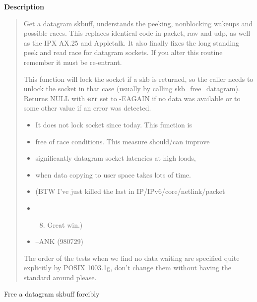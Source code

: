 \documentclass[a4paper,8pt,english]{sphinxmanual}
\begin{document}
\textbf{Description}
\begin{quote}

Get a datagram skbuff, understands the peeking, nonblocking wakeups
and possible races. This replaces identical code in packet, raw and
udp, as well as the IPX AX.25 and Appletalk. It also finally fixes
the long standing peek and read race for datagram sockets. If you
alter this routine remember it must be re-entrant.

This function will lock the socket if a skb is returned, so
the caller needs to unlock the socket in that case (usually by
calling skb\_free\_datagram). Returns NULL with \textbf{err} set to
-EAGAIN if no data was available or to some other value if an
error was detected.
\begin{itemize}
\item {} 
It does not lock socket since today. This function is

\item {} 
free of race conditions. This measure should/can improve

\item {} 
significantly datagram socket latencies at high loads,

\item {} 
when data copying to user space takes lots of time.

\item {} 
(BTW I've just killed the last  in IP/IPv6/core/netlink/packet

\item {} \begin{enumerate}
\setcounter{enumi}{7}
\item {} 
Great win.)

\end{enumerate}

\item {} 
--ANK (980729)

\end{itemize}

The order of the tests when we find no data waiting are specified
quite explicitly by POSIX 1003.1g, don't change them without having
the standard around please.
\end{quote}

\begin{fulllineitems}
\label{networking/kapi:c.skb_kill_datagram}
Free a datagram skbuff forcibly

\end{fulllineitems}
\end{document}
